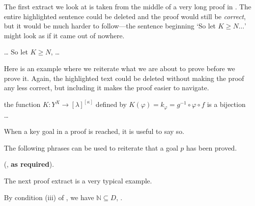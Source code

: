 The first extract we look at is taken from the middle of a very long proof in . The entire highlighted sentence could be deleted and the proof would still be \textit{correct}, but it would be much harder to follow---the sentence beginning `So let $K \ge N\dots{}$' might look as if it came out of nowhere.

\begin{extract}
\label{xtrStatingGoalsExample}
\dots{}  So let $K \ge N$, \dots{}
\end{extract}

Here is an example where we reiterate what we are about to prove before we prove it. Again, the highlighted text could be deleted without making the proof any less correct, but including it makes the proof easier to navigate.

\begin{extract}
\label{xtrStatingGoalsExampleTwo}
 the function $K : Y^X \to [\lambda]^{[\kappa]}$ defined by $K(\varphi) = k_{\varphi} = g^{-1} \circ \varphi \circ f$ is a bijection \dots{}
\end{extract}

When a key goal in a proof is reached, it is useful to say so.

\begin{vocabulary}
\label{vcbConclusions}
The following phrases can be used to reiterate that a goal $p$ has been proved.

\begin{vocabtemplate}
 (, \textbf{as required}).
\end{vocabtemplate}
\end{vocabulary}

The next proof extract is a very typical example.

\begin{extract}
\label{xtrConclusionExample}
By condition (iii) of , we have $\mathbb{N} \subseteq D$,  .
\end{extract}


